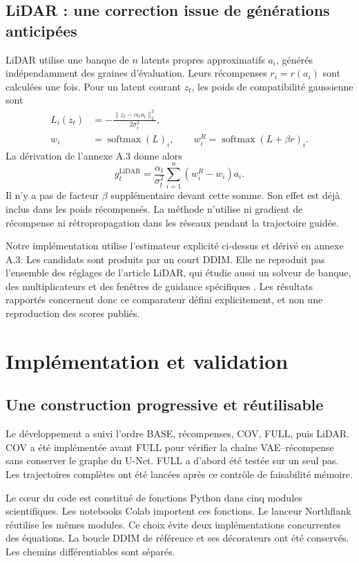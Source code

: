 \documentclass[11pt,a4paper]{article}
\newcommand{\softmax}{\operatorname{softmax}}
\newcommand{\code}[1]{\texttt{\detokenize{#1}}}
\begin{document}
\subsection{LiDAR : une correction issue de générations anticipées}
LiDAR utilise une banque de $n$ latents propres approximatifs $a_i$, générés indépendamment des graines d'évaluation. Leurs récompenses $r_i=r(a_i)$ sont calculées une fois. Pour un latent courant $z_t$, les poids de compatibilité gaussienne sont
\begin{align}
L_i(z_t)&=-\frac{\lVert z_t-\alpha_ta_i\rVert_2^2}{2\sigma_t^2},\\
w_i&=\softmax(L)_i,\qquad
w_i^R=\softmax(L+\beta r)_i.
\end{align}
La dérivation de l'annexe A.3 donne alors
\begin{equation}\label{eq:lidar}
g_t^{\mathrm{LiDAR}}=\frac{\alpha_t}{\sigma_t^2}
\sum_{i=1}^{n}(w_i^R-w_i)a_i.
\end{equation}
Il n'y a pas de facteur $\beta$ supplémentaire devant cette somme. Son effet est déjà inclus dans les poids récompensés. La méthode n'utilise ni gradient de récompense ni rétropropagation dans les réseaux pendant la trajectoire guidée.

Notre implémentation utilise l'estimateur explicité ci-dessus et dérivé en annexe A.3. Les candidats sont produits par un court DDIM. Elle ne reproduit pas l'ensemble des réglages de l'article LiDAR, qui étudie aussi un solveur de banque, des multiplicateurs et des fenêtres de guidance spécifiques \cite{lidar}. Les résultats rapportés concernent donc ce comparateur défini explicitement, et non une reproduction des scores publiés.

\section{Implémentation et validation}
\subsection{Une construction progressive et réutilisable}
Le développement a suivi l'ordre BASE, récompenses, COV, FULL, puis LiDAR. COV a été implémentée avant FULL pour vérifier la chaîne VAE--récompense sans conserver le graphe du U-Net. FULL a d'abord été testée sur un seul pas. Les trajectoires complètes ont été lancées après ce contrôle de faisabilité mémoire.

Le c\oe{}ur du code est constitué de fonctions Python dans cinq modules scientifiques. Les notebooks Colab importent ces fonctions. Le lanceur Northflank réutilise les mêmes modules. Ce choix évite deux implémentations concurrentes des équations. La boucle DDIM de référence et ses décorateurs \code{no_grad} ont été conservés. Les chemins différentiables sont séparés.
\end{document}

